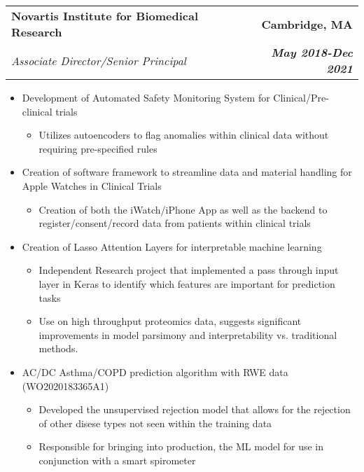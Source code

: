 \documentclass[letterpaper,9pt]{article}
\makeatletter
\newcommand{\resitem}[1]{\item #1 \vspace{-2pt}}
\newcommand{\ressubheading}[4]{
\begin{tabular*}{6.5in}{l@{\extracolsep{\fill}}r}
		\textbf{#1} & {#2} \\
		\textit{#3} & \textit{#4} \\
\end{tabular*}\vspace{-6pt}}
\makeatother
\begin{document}
\ressubheading{Novartis Institute for Biomedical Research}{\textbf{Cambridge, MA}}{Associate Director/Senior Principal}{\textbf{May 2018-Dec 2021}}
\begin{itemize}
\resitem {Development of Automated Safety Monitoring System for Clinical/Pre-clinical trials }
	\begin{itemize}
	\item Utilizes autoencoders to flag anomalies within clinical data without requiring pre-specified rules
	\end{itemize}

\resitem{Creation of software framework to streamline data and material handling for Apple Watches in Clinical Trials}
	\begin{itemize}
	\item Creation of both the iWatch/iPhone App as well as the backend to register/consent/record data from patients within clinical trials
	\end{itemize}

\resitem{Creation of Lasso Attention Layers for interpretable machine learning}
	\begin{itemize}
	\item Independent Research project that implemented a pass through input layer in Keras to identify which features are important for prediction tasks
	\end{itemize}
	\begin{itemize}
	\item Use on high throughput proteomics data, suggests significant improvements in model parsimony and interpretability vs. traditional methods. 
	\end{itemize}
\resitem{AC/DC Asthma/COPD prediction algorithm with RWE data (WO2020183365A1)}
	\begin{itemize}
	\item Developed the unsupervised rejection model that allows for the rejection of other disese types not seen within the training data
	\item Responsible for bringing into production, the ML model for use in conjunction with a smart spirometer
	\end{itemize}
\end{itemize}
\end{document}
